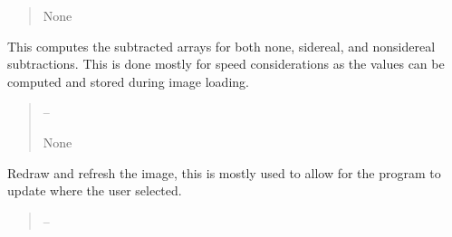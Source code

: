 \documentclass[letterpaper,11pt,english]{sphinxmanual}
\begin{document}
\begin{savenotes}
\begin{fulllineitems}
\begin{savenotes}
\begin{fulllineitems}
\begin{quote}
\begin{description}
\begin{itemize}
\end{itemize}

\sphinxAtStartPar
None

\end{description}\end{quote}

\end{fulllineitems}\end{savenotes}


\begin{savenotes}\begin{fulllineitems}
\label{\detokenize{code/opihiexarata.gui.selector:opihiexarata.gui.selector.TargetSelectorWindow._recompute_subtraction_arrays}}
\pysigstartsignatures
{}
\pysigstopsignatures
\sphinxAtStartPar
This computes the subtracted arrays for both none, sidereal, and
non\sphinxhyphen{}sidereal subtractions. This is done mostly for speed considerations
as the values can be computed and stored during image loading.
\begin{quote}\begin{description}
\sphinxAtStartPar
{} – 

\sphinxAtStartPar
None

\end{description}\end{quote}

\end{fulllineitems}\end{savenotes}


\begin{savenotes}\begin{fulllineitems}
\label{\detokenize{code/opihiexarata.gui.selector:opihiexarata.gui.selector.TargetSelectorWindow._refresh_image}}
\pysigstartsignatures
{}
\pysigstopsignatures
\sphinxAtStartPar
Redraw and refresh the image, this is mostly used to allow for the
program to update where the user selected.
\begin{quote}\begin{description}
\sphinxAtStartPar
{} – 


\end{description}
\end{quote}
\end{fulllineitems}
\end{savenotes}
\end{fulllineitems}
\end{savenotes}
\end{document}
